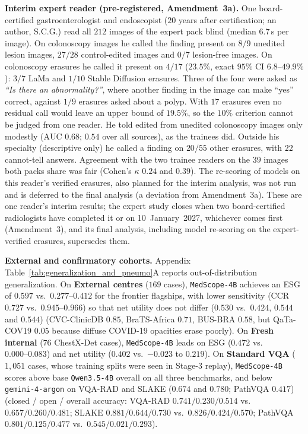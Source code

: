 \documentclass[5p,times,twocolumn,authoryear]{elsarticle}
\begin{document}
\textbf{Interim expert reader (pre-registered, Amendment~3a).} One board-certified gastroenterologist and endoscopist ($20$ years after certification; an author, S.C.G.) read all $212$ images of the expert pack blind (median $6.7$\,s per image). On colonoscopy images he called the finding present on $8/9$ unedited lesion images, $27/28$ control-edited images and $0/7$ lesion-free images. On colonoscopy erasures he called it present on $4/17$ ($23.5\%$, exact $95\%$ CI $6.8\text{--}49.9\%$): $3/7$ LaMa and $1/10$ Stable Diffusion erasures. Three of the four were asked as \emph{``Is there an abnormality?''}, where another finding in the image can make ``yes'' correct, against $1/9$ erasures asked about a polyp. With $17$ erasures even no residual call would leave an upper bound of $19.5\%$, so the $10\%$ criterion cannot be judged from one reader. He told edited from unedited colonoscopy images only modestly ($\text{AUC } 0.68$; $0.54$ over all sources), as the trainees did. Outside his specialty (descriptive only) he called a finding on $20/55$ other erasures, with $22$ cannot-tell answers. Agreement with the two trainee readers on the $39$ images both packs share was fair (Cohen's $\kappa$ $0.24$ and $0.39$). The re-scoring of models on this reader's verified erasures, also planned for the interim analysis, was not run and is deferred to the final analysis (a deviation from Amendment~3a). These are one reader's interim results; the expert study closes when two board-certified radiologists have completed it or on 10~January~2027, whichever comes first (Amendment~3), and its final analysis, including model re-scoring on the expert-verified erasures, supersedes them.

\textbf{External and confirmatory cohorts.} Appendix Table~\ref{tab:generalization_and_pneumo}A reports out-of-distribution generalization. On \textbf{External centres} ($169$ cases), \texttt{MedScope-4B} achieves an ESG of $0.597$ vs.\ $0.277\text{--}0.412$ for the frontier flagships, with lower sensitivity (CCR $0.727$ vs.\ $0.945\text{--}0.966$) so that net utility does not differ ($0.530$ vs.\ $0.424$, $0.544$ and $0.544$) (CVC-ClinicDB $0.85$, BraTS-Africa $0.71$, BUS-BRA $0.58$, but QaTa-COV19 $0.05$ because diffuse COVID-19 opacities erase poorly). On \textbf{Fresh internal} ($76$ ChestX-Det cases), \texttt{MedScope-4B} leads on ESG ($0.472$ vs.\ $0.000\text{--}0.083$) and net utility ($0.402$ vs.\ $-0.023$ to $0.219$). On \textbf{Standard VQA} ($1,051$ cases, whose training splits were seen in Stage-3 replay), \texttt{MedScope-4B} scores above base \texttt{Qwen3.5-4B} overall on all three benchmarks, and below \texttt{gemini-4-argon} on VQA-RAD and SLAKE ($0.674$ and $0.780$; PathVQA $0.417$) (closed / open / overall accuracy: VQA-RAD $0.741 / 0.230 / 0.514$ vs.\ $0.657 / 0.260 / 0.481$; SLAKE $0.881 / 0.644 / 0.730$ vs.\ $0.826 / 0.424 / 0.570$; PathVQA $0.801 / 0.125 / 0.477$ vs.\ $0.545 / 0.021 / 0.293$).
\end{document}
